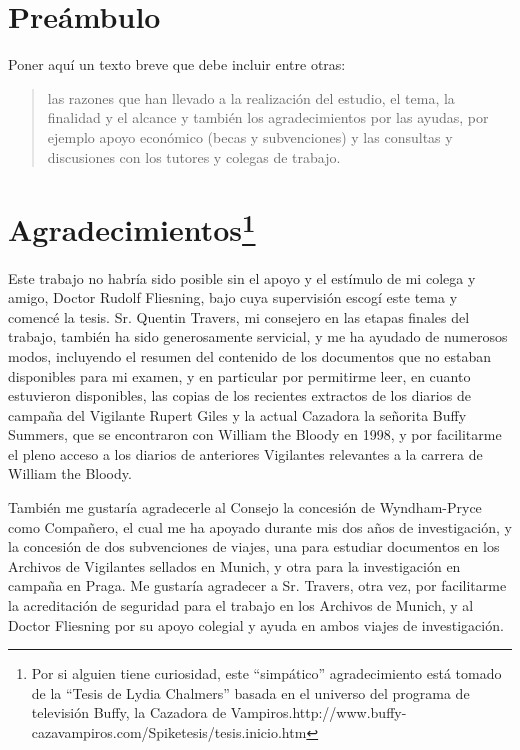 

\chapter*{Preámbulo}
\thispagestyle{empty}
Poner aquí un texto breve que debe incluir entre otras:
\begin{quote}
	las razones que han llevado a la realización del estudio, el tema, la finalidad y el alcance y también los agradecimientos por las ayudas, por ejemplo apoyo económico (becas y subvenciones) y las consultas y discusiones con los tutores y colegas de trabajo. \citep{UNE50136:97}
\end{quote}


\cleardoublepage %

\chapter*{Agradecimientos\footnote{Por si alguien tiene curiosidad, este ``simpático'' agradecimiento está tomado de la ``Tesis de Lydia Chalmers'' basada en el universo del programa de televisión Buffy, la Cazadora de Vampiros.http://www.buffy-cazavampiros.com/Spiketesis/tesis.inicio.htm}
}

\thispagestyle{empty}
\vspace{1cm}

Este trabajo no habría sido posible sin el apoyo y el estímulo de mi colega y amigo, Doctor Rudolf Fliesning,  bajo cuya supervisión escogí este tema y comencé la tesis. Sr. Quentin Travers, mi consejero en las etapas finales del trabajo, también ha sido generosamente servicial, y me ha ayudado de numerosos modos, incluyendo el resumen del contenido de los documentos que no estaban disponibles para mi examen, y en particular por permitirme leer, en cuanto estuvieron  disponibles, las copias de los  recientes extractos de los diarios de campaña del Vigilante Rupert Giles y la actual Cazadora la señorita Buffy Summers, que se encontraron con William the Bloody en 1998, y por facilitarme el pleno acceso  a los diarios de anteriores Vigilantes relevantes a la carrera de William the Bloody.

También me gustaría agradecerle al Consejo la concesión de Wyndham-Pryce como Compañero, el cual me ha apoyado durante mis dos años de investigación, y la concesión de dos subvenciones de viajes, una para estudiar documentos en los Archivos de Vigilantes sellados en Munich, y otra para la investigación en campaña en Praga. Me gustaría agradecer a Sr. Travers, otra vez, por facilitarme  la acreditación  de seguridad para el trabajo en los Archivos de Munich, y al Doctor Fliesning por su apoyo colegial y ayuda en ambos viajes de investigación.

